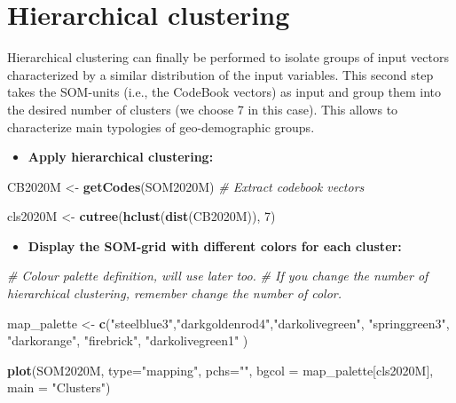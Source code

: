 \documentclass[
]{book}
\newenvironment{Shaded}{\begin{snugshade}}{\end{snugshade}}
\newcommand{\AttributeTok}[1]{\textcolor[rgb]{0.13,0.29,0.53}{#1}}
\newcommand{\CommentTok}[1]{\textcolor[rgb]{0.56,0.35,0.01}{\textit{#1}}}
\newcommand{\DecValTok}[1]{\textcolor[rgb]{0.00,0.00,0.81}{#1}}
\newcommand{\FunctionTok}[1]{\textcolor[rgb]{0.13,0.29,0.53}{\textbf{#1}}}
\newcommand{\NormalTok}[1]{#1}
\newcommand{\OtherTok}[1]{\textcolor[rgb]{0.56,0.35,0.01}{#1}}
\newcommand{\StringTok}[1]{\textcolor[rgb]{0.31,0.60,0.02}{#1}}
\providecommand{\tightlist}{%
  \setlength{\itemsep}{0pt}\setlength{\parskip}{0pt}}
\begin{document}
\hypertarget{hierarchical-clustering}{%
\section{Hierarchical clustering}\label{hierarchical-clustering}}

Hierarchical clustering can finally be performed to isolate groups of input vectors characterized by a similar distribution of the input variables.
This second step takes the SOM-units (i.e., the CodeBook vectors) as input and group them into the desired number of clusters (we choose 7 in this case).
This allows to characterize main typologies of geo-demographic groups.

\begin{itemize}
\tightlist
\item
  \textbf{Apply hierarchical clustering:}
\end{itemize}

\begin{Shaded}
\begin{Highlighting}[]
\NormalTok{CB2020M }\OtherTok{\textless{}{-}} \FunctionTok{getCodes}\NormalTok{(SOM2020M) }\CommentTok{\# Extract codebook vectors}

\NormalTok{cls2020M }\OtherTok{\textless{}{-}} \FunctionTok{cutree}\NormalTok{(}\FunctionTok{hclust}\NormalTok{(}\FunctionTok{dist}\NormalTok{(CB2020M)), }\DecValTok{7}\NormalTok{)}
\end{Highlighting}
\end{Shaded}

\begin{itemize}
\tightlist
\item
  \textbf{Display the SOM-grid with different colors for each cluster:}
\end{itemize}

\begin{Shaded}
\begin{Highlighting}[]
\CommentTok{\# Colour palette definition, will use later too.}
\CommentTok{\# If you change the number of hierarchical clustering, remember change the number of color.}

\NormalTok{map\_palette }\OtherTok{\textless{}{-}} \FunctionTok{c}\NormalTok{(}\StringTok{"steelblue3"}\NormalTok{,}\StringTok{"darkgoldenrod4"}\NormalTok{,}\StringTok{"darkolivegreen"}\NormalTok{, }\StringTok{"springgreen3"}\NormalTok{, }\StringTok{"darkorange"}\NormalTok{, }\StringTok{"firebrick"}\NormalTok{, }\StringTok{"darkolivegreen1"}\NormalTok{ )}

\FunctionTok{plot}\NormalTok{(SOM2020M, }\AttributeTok{type=}\StringTok{"mapping"}\NormalTok{, }\AttributeTok{pchs=}\StringTok{""}\NormalTok{, }\AttributeTok{bgcol =}\NormalTok{ map\_palette[cls2020M], }\AttributeTok{main =} \StringTok{"Clusters"}\NormalTok{)}
\end{Highlighting}
\end{Shaded}
\end{document}
